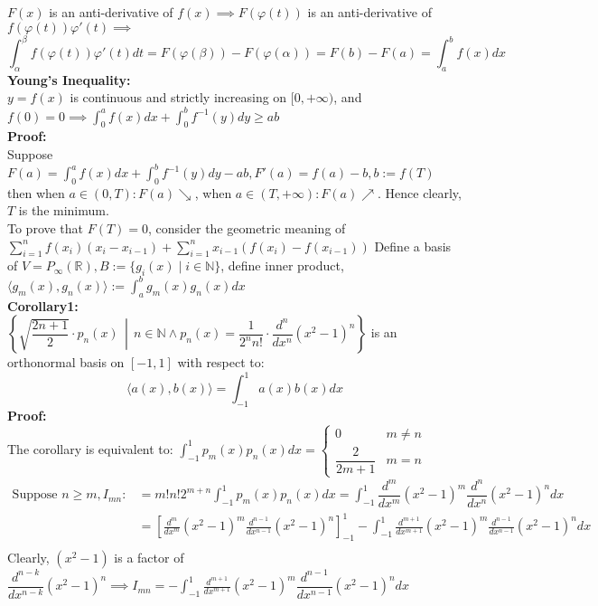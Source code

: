 \documentclass{article}
\newcommand{\R}{\mathbb{R}}
\newcommand{\N}{\mathbb{N}}
\newcommand{\0}{{\bf{0}}}
\begin{document}
$F(x)$ is an anti-derivative of $f(x)\implies F(\varphi(t))$ is an anti-derivative of $f(\varphi(t))\varphi'(t)\implies$\\
$$\int_\alpha^\beta f(\varphi(t))\varphi'(t)dt=F(\varphi(\beta))-F(\varphi(\alpha))=F(b)-F(a)=\int_a^bf(x)dx$$
\textbf{Young's Inequality:}\\
$y=f(x)$ is continuous and strictly increasing on $[0,+\infty)$, and $f(0)=0\implies\displaystyle\int_0^af(x)dx+\displaystyle\int_0^bf^{-1}(y)dy\geq ab$\\
\textbf{Proof:}\\
Suppose $F(a)=\displaystyle\int_0^af(x)dx+\int_{0}^{b}f^{-1}\left(y\right)dy-ab,F'\left(a\right)=f\left(a\right)-b,b:=f(T)$ then when $a\in(0,T):F(a)\searrow$, when $a\in(T,+\infty):F(a)\nearrow$. Hence clearly, $T$ is the minimum.\\
To prove that $F(T)=0$, consider the geometric meaning of $\sum\limits_{i=1}^nf(x_i)(x_i-x_{i-1})+\sum\limits_{i=1}^nx_{i-1}(f(x_i)-f(x_{i-1}))$ 
Define a basis of $V=P_\infty(\R),B:=\{g_i(x)\mid i\in\N\}$, define inner product,$\langle g_m(x),g_n(x)\rangle:=\displaystyle\int_a^bg_m(x)g_n(x)dx$\\
\textbf{Corollary1:}\\
$\left\{\sqrt{\dfrac{2n+1}{2}}\cdot p_n(x)\,\middle\vert\,n\in\N\land p_n(x)=\dfrac{1}{2^nn!}\cdot\dfrac{d^n}{dx^n}\left(x^2-1\right)^n\right\}$ is an orthonormal basis on $[-1,1]$ with respect to:
$$\langle a(x),b(x)\rangle =\displaystyle\int_{-1}^1a(x)b(x)dx$$
\textbf{Proof:}\\
The corollary is equivalent to: $\displaystyle\int_{-1}^1p_m(x)p_n(x)dx=\begin{cases}
    0&m\neq n\\
    \dfrac{2}{2m+1}&m=n
\end{cases}$
\begin{equation}
\begin{split}
    \mbox{Suppose }n\geq m,I_{mn}:&=m!n!2^{m+n}\displaystyle\int_{-1}^1p_m(x)p_n(x)dx=\displaystyle\int_{-1}^1\dfrac{d^m}{dx^m}\left(x^2-1\right)^m\dfrac{d^n}{dx^n}\left(x^2-1\right)^ndx\\
    &=\left[\frac{d^{m}}{dx^{m}}\left(x^{2}-1\right)^{m}\frac{d^{n-1}}{dx^{n-1}}\left(x^{2}-1\right)^{n}\right]_{-1}^{1}-\int_{-1}^{1}\frac{d^{m+1}}{dx^{m+1}}\left(x^{2}-1\right)^{m}\frac{d^{n-1}}{dx^{n-1}}\left(x^{2}-1\right)^{n}dx\\
\end{split}
\end{equation}
Clearly, $\left(x^{2}-1\right)$ is a factor of $\dfrac{d^{n-k}}{dx^{n-k}}\left(x^2-1\right)^n\implies I_{mn}=-\displaystyle\int_{-1}^1\frac{d^{m+1}}{dx^{m+1}}\left(x^2-1\right)^m\dfrac{d^{n-1}}{dx^{n-1}}\left(x^2-1\right)^ndx$\\
\end{document}

